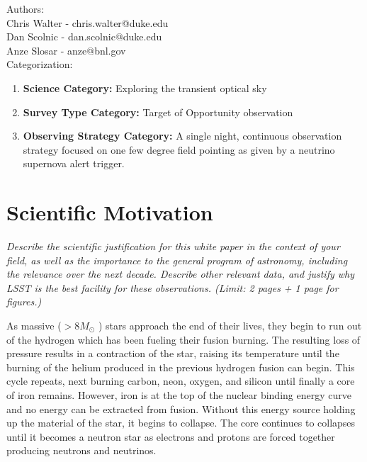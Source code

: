 \documentclass[11pt]{article}
\begin{document}
\noindent
Authors: \\

\noindent
Chris Walter - chris.walter@duke.edu \\
Dan Scolnic - dan.scolnic@duke.edu \\
Anze Slosar - anze@bnl.gov \\

\noindent
Categorization: 
\begin{enumerate} 
\item {\bf Science Category:}  Exploring the transient optical sky
\item {\bf Survey Type Category:}  Target of Opportunity observation
\item {\bf Observing Strategy Category:}  A single night, continuous
  observation strategy focused on one few degree field pointing as given by
  a neutrino supernova alert trigger.
\end{enumerate}  

\clearpage

\section{Scientific Motivation}

\begin{footnotesize}
{\it Describe the scientific justification for this white paper in the context
of your field, as well as the importance to the general program of astronomy, 
including the relevance over the next decade. 
Describe other relevant data, and justify why LSST is the best facility for these observations.
(Limit: 2 pages + 1 page for figures.)}
\end{footnotesize}

\vspace{.6in}

As massive ($ > 8 M_\odot$ ) stars approach the end of their lives,
they begin to run out of the hydrogen which has been fueling their
fusion burning.  The resulting loss of pressure results in a
contraction of the star, raising its temperature until the burning of
the helium produced in the previous hydrogen fusion can begin. This
cycle repeats, next burning carbon, neon, oxygen, and silicon until
finally a core of iron remains.  However, iron is at the top of the
nuclear binding energy curve and no energy can be extracted from
fusion.  Without this energy source holding up the material of the
star, it begins to collapse.  The core continues to collapses until it
becomes a neutron star as electrons and protons are forced together
producing neutrons and neutrinos.
\end{document}
